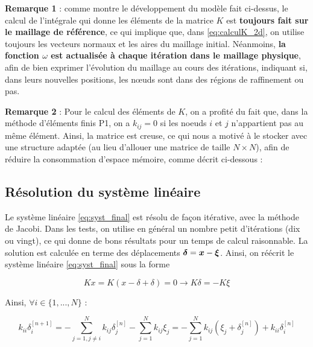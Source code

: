 \indent \textbf{Remarque 1} : comme montre le développement du modèle fait ci-dessus, le calcul de l'intégrale qui donne les éléments de la matrice \(K\) est \textbf{toujours fait sur le maillage de référence}, ce qui implique que, dans \eqref{eq:calculK_2d}, on utilise toujours les vecteurs normaux et les aires du maillage initial. Néanmoins, \textbf{la fonction \(\omega\) est actualisée à chaque itération dans le maillage physique}, afin de bien exprimer l'évolution du maillage au cours des itérations, indiquant si, dans leurs nouvelles positions, les nœuds sont dans des régions de raffinement ou pas.

\indent

\indent \textbf{Remarque 2} : Pour le calcul des éléments de \(K\), on a profité du fait que, dans la méthode d'éléments finis P1, on a \(k_{ij} = 0\) si les noeuds \(i\) et \(j\) n'appartient pas au même élément. Ainsi, la matrice est creuse, ce qui nous a motivé à le stocker avec une structure adaptée (au lieu d'allouer une matrice de taille \(N \times N\)), afin de réduire la consommation d'espace mémoire, comme décrit ci-dessous : 




\subsection{Résolution du système linéaire}
\label{subsec:jacobi}

\indent Le système linéaire \eqref{eq:syst_final} est résolu de façon itérative, avec la méthode de Jacobi. Dans les tests, on utilise en général un nombre petit d'itérations (dix ou vingt), ce qui donne de bons résultats pour un temps de calcul raisonnable. La solution est calculée en terme des déplacements \(\boldsymbol{\delta} = \boldsymbol{x} - \boldsymbol{\xi}\). Ainsi, on réécrit le système linéaire \eqref{eq:syst_final} sous la forme 

\begin{equation*}
	Kx = K(x-\delta+\delta) = 0 \longrightarrow K\delta = -K\xi
\end{equation*}

\indent Ainsi, \(\forall i \in \{1,...,N\} \) :

\begin{equation*}
	k_{ii}\delta_i^{[n+1]} = -\sum_{j=1,j \neq i}^N k_{ij}\delta_{j}^{[n]} - \sum_{j=1}^N k_{ij}\xi_{j} = -\sum_{j=1}^N k_{ij}(\xi_j + \delta_{j}^{[n]}) + k_{ii}\delta_i^{[n]}
\end{equation*}

